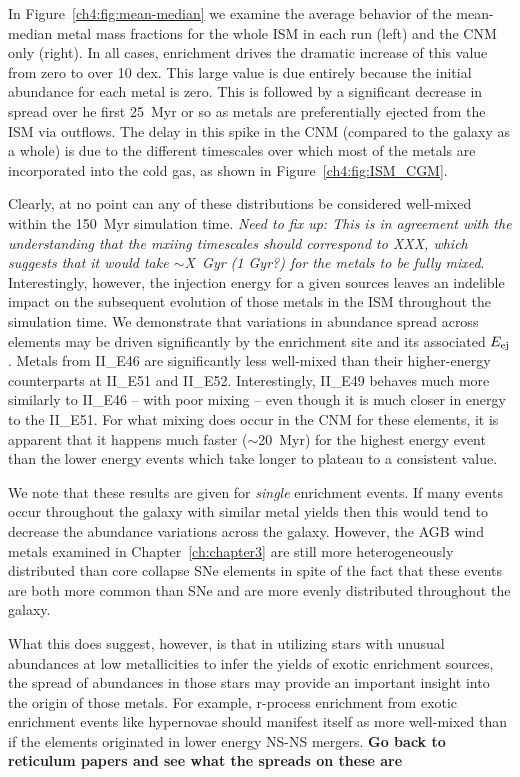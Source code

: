 In Figure~\ref{ch4:fig:mean-median} we examine the average behavior of the mean-median metal mass fractions for the whole ISM in each run (left) and the CNM only (right). In all cases, enrichment drives the dramatic increase of this value from zero to over 10 dex. This large value is due entirely because the initial abundance for each metal is zero. This is followed by a significant decrease in spread over he first 25~Myr or so as metals are preferentially ejected from the ISM via outflows. The delay in this spike in the CNM (compared to the galaxy as a whole) is due to the different timescales over which most of the metals are incorporated into the cold gas, as shown in Figure~\ref{ch4:fig:ISM_CGM}.

Clearly, at no point can any of these distributions be considered well-mixed within the 150~Myr simulation time. \textit{Need to fix up: This is in agreement with the understanding that the mxiing timescales should correspond to XXX, which suggests that it would take $\sim$X~Gyr (1 Gyr?) for the metals to be fully mixed}. Interestingly, however, the injection energy for a given sources leaves an indelible impact on the subsequent evolution of those metals in the ISM throughout the simulation time. We demonstrate that variations in abundance spread across elements may be driven significantly by the enrichment site and its associated $E_{\rm ej}$. Metals from II\_E46 are significantly less well-mixed than their higher-energy counterparts at II\_E51 and II\_E52. Interestingly, II\_E49 behaves much more similarly to II\_E46 -- with poor mixing -- even though it is much closer in energy to the II\_E51. For what mixing does occur in the CNM for these elements, it is apparent that it happens much faster ($\sim$20~Myr) for the highest energy event than the lower energy events which take longer to plateau to a consistent value.

We note that these results are given for \textit{single} enrichment events. If many events occur throughout the galaxy with similar metal yields then this would tend to decrease the abundance variations across the galaxy. However, the AGB wind metals examined in Chapter~\ref{ch:chapter3} are still more heterogeneously distributed than core collapse SNe elements in spite of the fact that these events are both more common than SNe and are more evenly distributed throughout the galaxy.

What this does suggest, however, is that in utilizing stars with unusual abundances at low metallicities to infer the yields of exotic enrichment sources, the spread of abundances in those stars may provide an important insight into the origin of those metals. For example, r-process enrichment from exotic enrichment events like hypernovae should manifest itself as more well-mixed than if the elements originated in lower energy NS-NS mergers.
\textbf{Go back to reticulum papers and see what the spreads on these are}


